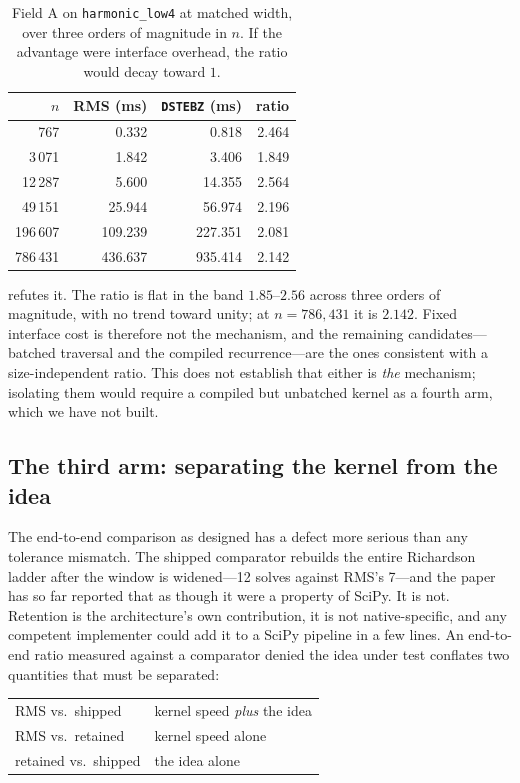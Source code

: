\documentclass[twocolumn,10pt,a4paper]{article}
\theoremstyle{plain}
\theoremstyle{definition}
\begin{document}
\begin{table}[t]
\centering\small
\caption{Field A on \texttt{harmonic\_low4} at matched width, over three orders
of magnitude in $n$. If the advantage were interface overhead, the ratio would
decay toward $1$.}
\label{tab:scaling}
\begin{tabular}{rrrr}
\toprule
$n$ & RMS (ms) & \texttt{DSTEBZ} (ms) & ratio \\
\midrule
767      & 0.332   & 0.818   & 2.464\\
3\,071   & 1.842   & 3.406   & 1.849\\
12\,287  & 5.600   & 14.355  & 2.564\\
49\,151  & 25.944  & 56.974  & 2.196\\
196\,607 & 109.239 & 227.351 & 2.081\\
786\,431 & 436.637 & 935.414 & 2.142\\
\bottomrule
\end{tabular}
\end{table}

 refutes it. The ratio is flat in the band $1.85$--$2.56$
across three orders of magnitude, with no trend toward unity; at
$n = 786{,}431$ it is $2.142$. Fixed interface cost is therefore not the
mechanism, and the remaining candidates---batched traversal and the compiled
recurrence---are the ones consistent with a size-independent ratio. This does
not establish that either is \emph{the} mechanism; isolating them would require
a compiled but unbatched kernel as a fourth arm, which we have not built.

\subsection{The third arm: separating the kernel from the idea}
\label{sec:thirdarm}

The end-to-end comparison as designed has a defect more serious than any
tolerance mismatch. The shipped comparator rebuilds the entire Richardson ladder
after the window is widened---12 solves against RMS's 7---and the paper has so
far reported that as though it were a property of SciPy. It is not. Retention is
the architecture's own contribution, it is not native-specific, and any
competent implementer could add it to a SciPy pipeline in a few lines. An
end-to-end ratio measured against a comparator denied the idea under test
conflates two quantities that must be separated:
\begin{center}
\begin{tabular}{ll}
RMS vs.\ shipped   & kernel speed \emph{plus} the idea\\
RMS vs.\ retained  & kernel speed alone\\
retained vs.\ shipped & the idea alone\\
\end{tabular}
\end{center}
\end{document}
